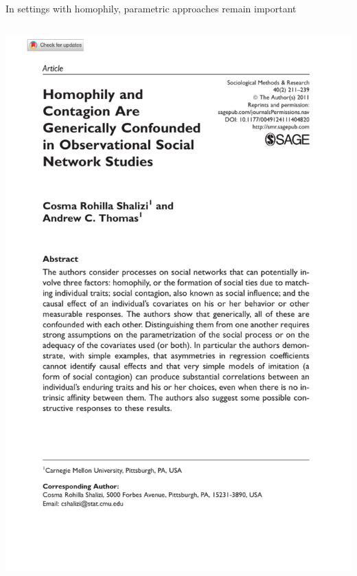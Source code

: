 \documentclass[aspectratio=169]{beamer}
\theoremstyle{remark}
\begin{document}
\begin{frame}{In settings with homophily, parametric approaches remain important}
\begin{columns}
\begin{column}{0.49\paperwidth}
{                \includegraphics[height=\textheight, page=1, trim={1.5cm 4.5cm 0cm 2.2cm}, clip]{./papers/thomas.pdf}
            }
        \end{column}
    \end{columns}
\end{frame}
\end{document}
